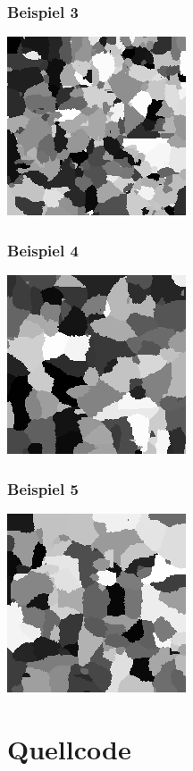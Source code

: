 \documentclass[a4paper,10pt,ngerman]{scrartcl}
\begin{document}
\subsubsection{Beispiel 3}
\centerline{\includegraphics{beispiel3}}
\newpage
\subsubsection{Beispiel 4}
\centerline{\includegraphics{beispiel4}}
\subsubsection{Beispiel 5}
\centerline{\includegraphics{beispiel5}}

\newpage
\section{Quellcode}
\end{document}
